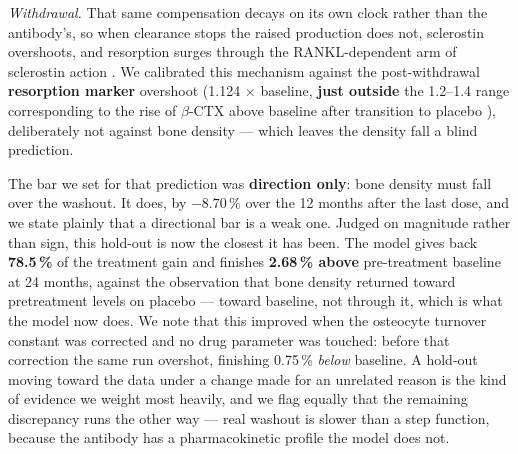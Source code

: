 \documentclass[10pt,letterpaper]{article}
\begin{document}
\emph{Withdrawal.} That same compensation decays on its own clock rather than
the antibody's, so when clearance stops the raised production does not,
sclerostin overshoots, and resorption surges through the RANKL-dependent arm
of sclerostin action \cite{wijenayaka2011}. We calibrated this mechanism
against the post-withdrawal \textbf{resorption marker} overshoot (1.124
$\times$ baseline, \textbf{just outside} the 1.2--1.4 range corresponding to the rise of
$\beta$-CTX above baseline after transition to placebo \cite{mcclung2018}),
deliberately not against bone density --- which leaves the density fall a blind
prediction.

The bar we set for that prediction was \textbf{direction only}: bone density
must fall over the washout. It does, by \textbf{$-8.70\,\%$} over the 12
months after the last dose, and we state plainly that a directional bar is a
weak one. Judged on magnitude rather than sign, this hold-out is now the closest
it has been. The model gives back \textbf{78.5\,\%} of the treatment gain and
finishes \textbf{2.68\,\% above} pre-treatment baseline at 24 months, against
the observation that bone density returned toward pretreatment levels on placebo
\cite{mcclung2018} --- toward baseline, not through it, which is what the model
now does. We note that this improved when the osteocyte turnover constant was
corrected and no drug parameter was touched: before that correction the same run
overshot, finishing 0.75\,\% \emph{below} baseline. A hold-out moving toward
the data under a change made for an unrelated reason is the kind of evidence we
weight most heavily, and we flag equally that the remaining discrepancy runs the
other way --- real washout is slower than a step function, because the antibody
has a pharmacokinetic profile the model does not.
\end{document}
